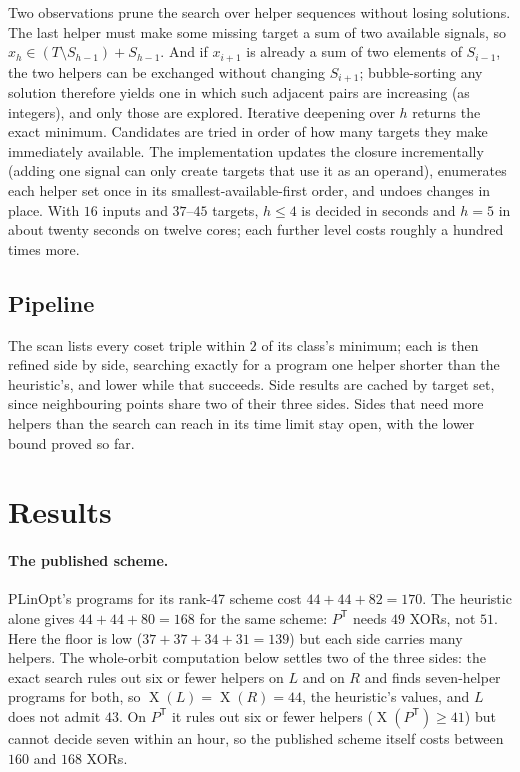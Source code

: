\documentclass[11pt]{article}
\theoremstyle{remark}
\newcommand{\XOR}{\operatorname{X}}
\begin{document}
Two observations prune the search over helper sequences without losing
solutions.  The last helper must make some missing target a sum of two
available signals, so $x_h\in(T\setminus S_{h-1})+S_{h-1}$.  And if
$x_{i+1}$ is already a sum of two elements of $S_{i-1}$, the two
helpers can be exchanged without changing $S_{i+1}$; bubble-sorting any
solution therefore yields one in which such adjacent pairs are
increasing (as integers), and only those are explored.  Iterative
deepening over $h$ returns the exact minimum.  Candidates are tried in
order of how many targets they make immediately available.  The
implementation updates the closure incrementally (adding one signal can
only create targets that use it as an operand), enumerates each helper
set once in its smallest-available-first order, and undoes changes in
place.  With $16$ inputs and $37$--$45$ targets, $h\le4$ is decided in
seconds and $h=5$ in about twenty seconds on twelve cores; each further
level costs roughly a hundred times more.

\subsection{Pipeline}

The scan lists every coset triple within $2$ of its class's minimum;
each is then refined side by side, searching exactly for a program one
helper shorter than the heuristic's, and lower while that succeeds.
Side results are cached by target set, since neighbouring points share
two of their three sides.  Sides that need more helpers than the search
can reach in its time limit stay open, with the lower bound proved so
far.

\section{Results}\label{sec:results}

\paragraph{The published scheme.}  PLinOpt's programs for its rank-47
scheme cost $44+44+82=170$.  The heuristic alone gives $44+44+80=168$
for the same scheme: $P^{\mathsf T}$ needs $49$ XORs, not $51$.  Here the
floor is low ($37+37+34+31=139$) but each side carries many helpers.
The whole-orbit computation below settles two of the three sides: the
exact search rules out six or fewer helpers on $L$ and on $R$ and finds
seven-helper programs for both, so $\XOR(L)=\XOR(R)=44$, the heuristic's
values, and $L$ does not admit $43$.  On $P^{\mathsf T}$ it rules out six
or fewer helpers ($\XOR(P^{\mathsf T})\ge41$) but cannot decide seven
within an hour, so the published scheme itself costs between $160$ and
$168$ XORs.
\end{document}
